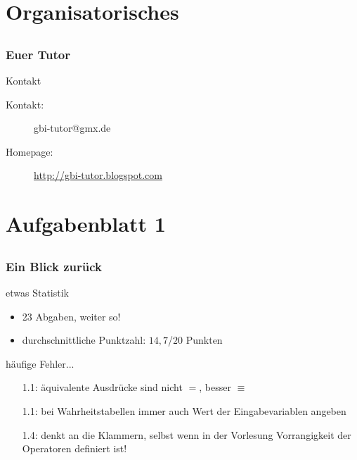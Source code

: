 
\section[Organisation]{Organisatorisches}
\subsection*{}
\begin{frame}
\frametitle{Euer Tutor}
        \begin{block}{Kontakt}
                \begin{description}
                        \item[Kontakt:] gbi-tutor@gmx.de
                        \item[Homepage:] \url{http://gbi-tutor.blogspot.com}
                \end{description}
        \end{block}
\end{frame}
\section[Blatt 1]{Aufgabenblatt 1}
\subsection*{}
\begin{frame}
	\frametitle{Ein Blick zurück}
	\begin{block}{etwas Statistik}
		\begin{itemize}
			\item 23 Abgaben, weiter so!
			\item durchschnittliche Punktzahl: $14,7$/$20$ Punkten 
		\end{itemize}
	\end{block}

	\begin{block}{häufige Fehler...}
		\begin{itemize}
			\item[1.1:] äquivalente Ausdrücke sind nicht $=$, besser $\equiv$ \pause
			\item[1.1:] bei Wahrheitstabellen immer auch Wert der Eingabevariablen angeben \pause
			\item[1.4:] denkt an die Klammern, selbst wenn in der Vorlesung Vorrangigkeit der Operatoren definiert ist!
		 \end{itemize}
	\end{block}
\end{frame}

